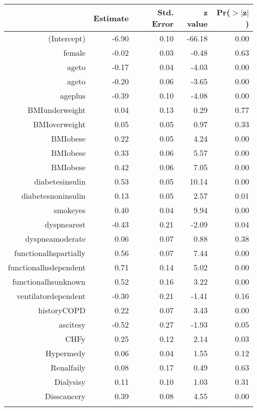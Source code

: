 \bigskip\bigskip
\centering
\begin{tabular}{rrrrr}
  \hline
 & Estimate & Std. Error & z value & Pr($>$$|$z$|$) \\ 
  \hline
(Intercept) & -6.90 & 0.10 & -66.18 & 0.00 \\ 
  female & -0.02 & 0.03 & -0.48 & 0.63 \\ 
  age\-65\-to\-74 & -0.17 & 0.04 & -4.03 & 0.00 \\ 
  age\-75\-to\-84 & -0.20 & 0.06 & -3.65 & 0.00 \\ 
  age\-85\-plus & -0.39 & 0.10 & -4.08 & 0.00 \\ 
  BMI\-underweight & 0.04 & 0.13 & 0.29 & 0.77 \\ 
  BMI\-overweight & 0.05 & 0.05 & 0.97 & 0.33 \\ 
  BMI\-obese\-1 & 0.22 & 0.05 & 4.24 & 0.00 \\ 
  BMI\-obese\-2 & 0.33 & 0.06 & 5.57 & 0.00 \\ 
  BMI\-obese\-3 & 0.42 & 0.06 & 7.05 & 0.00 \\ 
  diabetes\-insulin & 0.53 & 0.05 & 10.14 & 0.00 \\ 
  diabetes\-noninsulin & 0.13 & 0.05 & 2.57 & 0.01 \\ 
  smoke\-yes & 0.40 & 0.04 & 9.94 & 0.00 \\ 
  dyspnea\-rest & -0.43 & 0.21 & -2.09 & 0.04 \\ 
  dyspnea\-moderate & 0.06 & 0.07 & 0.88 & 0.38 \\ 
  functional\-hs\-partially & 0.56 & 0.07 & 7.44 & 0.00 \\ 
  functional\-hs\-dependent & 0.71 & 0.14 & 5.02 & 0.00 \\ 
  functional\-hs\-unknown & 0.52 & 0.16 & 3.22 & 0.00 \\ 
  ventilator\-dependent & -0.30 & 0.21 & -1.41 & 0.16 \\ 
  history\-COPD & 0.22 & 0.07 & 3.43 & 0.00 \\ 
  ascites\-y & -0.52 & 0.27 & -1.93 & 0.05 \\ 
  CHF\-y & 0.25 & 0.12 & 2.14 & 0.03 \\ 
  Hyper\-med\-y & 0.06 & 0.04 & 1.55 & 0.12 \\ 
  Renal\-fail\-y & 0.08 & 0.17 & 0.49 & 0.63 \\ 
  Dialysis\-y & 0.11 & 0.10 & 1.03 & 0.31 \\ 
  Diss\-cancer\-y & 0.39 & 0.08 & 4.55 & 0.00 \\ 
$$
\end{tabular}
